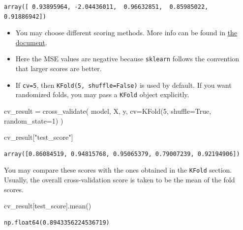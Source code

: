 \documentclass[
  letterpaper,
  DIV=11,
  numbers=noendperiod]{scrreprt}
\newenvironment{Shaded}{\begin{snugshade}}{\end{snugshade}}
\newcommand{\DecValTok}[1]{\textcolor[rgb]{0.68,0.00,0.00}{#1}}
\newcommand{\NormalTok}[1]{\textcolor[rgb]{0.00,0.23,0.31}{#1}}
\newcommand{\OperatorTok}[1]{\textcolor[rgb]{0.37,0.37,0.37}{#1}}
\newcommand{\StringTok}[1]{\textcolor[rgb]{0.13,0.47,0.30}{#1}}
\newcommand{\VariableTok}[1]{\textcolor[rgb]{0.07,0.07,0.07}{#1}}
\providecommand{\tightlist}{%
  \setlength{\itemsep}{0pt}\setlength{\parskip}{0pt}}
\theoremstyle{definition}
\theoremstyle{definition}
\theoremstyle{plain}
\theoremstyle{plain}
\theoremstyle{remark}
\begin{document}
\begin{tcolorbox}
\begin{verbatim}
array([ 0.93895964, -2.04436011,  0.96632851,  0.85985022,  0.91886942])
\end{verbatim}

\begin{itemize}
\tightlist
\item
  You may choose different scoring methods. More info can be found in
  \href{https://scikit-learn.org/stable/modules/model_evaluation.html\#scoring-parameter}{the
  document}.
\item
  Here the MSE values are negative because \texttt{sklearn} follows the
  convention that larger scores are better.
\item
  If \texttt{cv=5}, then \texttt{KFold(5,\ shuffle=False)} is used by
  default. If you want randomized folds, you may pass a \texttt{KFold}
  object explicitly.
\end{itemize}

\begin{Shaded}
\begin{Highlighting}[]
\NormalTok{cv\_result }\OperatorTok{=}\NormalTok{ cross\_validate(}
\NormalTok{    model, X, y, cv}\OperatorTok{=}\NormalTok{KFold(}\DecValTok{5}\NormalTok{, shuffle}\OperatorTok{=}\VariableTok{True}\NormalTok{, random\_state}\OperatorTok{=}\DecValTok{1}\NormalTok{)}
\NormalTok{)}

\NormalTok{cv\_result[}\StringTok{"test\_score"}\NormalTok{]}
\end{Highlighting}
\end{Shaded}

\begin{verbatim}
array([0.86084519, 0.94815768, 0.95065379, 0.79007239, 0.92194906])
\end{verbatim}

You may compare these scores with the ones obtained in the
\texttt{KFold} section. Usually, the overall cross-validation score is
taken to be the mean of the fold scores.

\begin{Shaded}
\begin{Highlighting}[]
\NormalTok{cv\_result[}\StringTok{\textquotesingle{}test\_score\textquotesingle{}}\NormalTok{].mean()}
\end{Highlighting}
\end{Shaded}

\begin{verbatim}
np.float64(0.8943356224536719)
\end{verbatim}

\end{tcolorbox}
\end{document}
